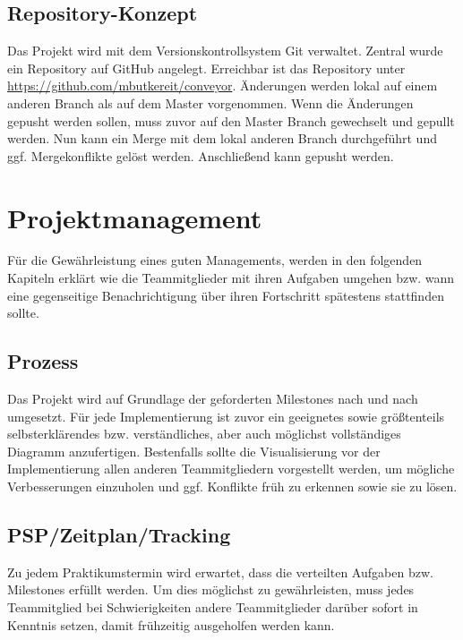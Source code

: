\documentclass[a4paper, 11pt]{article}
\begin{document}
\newpage

\subsection{Repository-Konzept}
Das Projekt wird mit dem Versionskontrollsystem Git verwaltet. Zentral wurde ein Repository auf GitHub angelegt. Erreichbar ist das Repository unter \url{https://github.com/mbutkereit/conveyor}. Änderungen werden lokal auf einem anderen Branch als auf dem Master vorgenommen. Wenn die Änderungen gepusht werden sollen, muss zuvor auf den Master Branch gewechselt und gepullt werden. Nun kann ein Merge mit dem lokal anderen Branch durchgeführt und ggf. Mergekonflikte gelöst werden. Anschließend kann gepusht werden.

\section{Projektmanagement}
Für die Gewährleistung eines guten Managements, werden in den folgenden Kapiteln erklärt wie die Teammitglieder mit ihren Aufgaben umgehen bzw. wann eine gegenseitige Benachrichtigung über ihren Fortschritt spätestens stattfinden sollte.

\subsection{Prozess}
Das Projekt wird auf Grundlage der geforderten Milestones nach und nach umgesetzt. Für jede Implementierung ist zuvor ein geeignetes sowie größtenteils selbsterklärendes bzw. verständliches, aber auch möglichst vollständiges Diagramm anzufertigen. Bestenfalls sollte die Visualisierung vor der Implementierung allen anderen Teammitgliedern vorgestellt werden, um mögliche Verbesserungen einzuholen und ggf. Konflikte früh zu erkennen sowie sie zu lösen.

\subsection{PSP/Zeitplan/Tracking}
Zu jedem Praktikumstermin wird erwartet, dass die verteilten Aufgaben bzw. Milestones erfüllt werden. Um dies möglichst zu gewährleisten, muss jedes Teammitglied bei Schwierigkeiten andere Teammitglieder darüber sofort in Kenntnis setzen, damit frühzeitig ausgeholfen werden kann.
\end{document}
